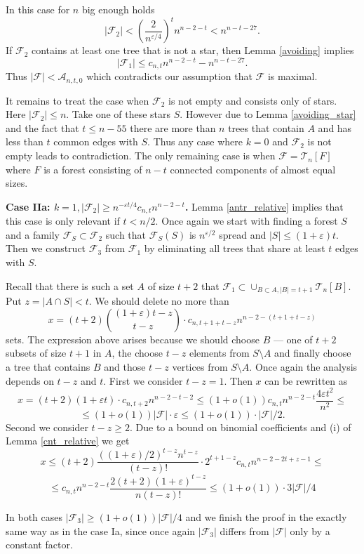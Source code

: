 \documentclass[11pt,letterpaper]{amsart}
\newcommand{\eps}{\varepsilon}
\renewcommand{\le}{\leqslant}
\renewcommand{\ge}{\geqslant}
\newcommand{\ff}{\mathcal{F}}
\newcommand{\aaa}{\mathcal{A}}
\newcommand{\T}{\mathcal{T}}
\begin{document}
In this case for $n$ big enough holds $$|\ff_2| < \left(\frac{2}{n^{\eps/4}}\right)^tn^{n-2-t} < n^{n-t-27}.$$
If $\ff_2$ contains at least one tree that is not a star, then Lemma \ref{avoiding} implies $$|\ff_1|\leqslant c_{n, t}n^{n-2-t} - n^{n-t-27}.$$ Thus $|\ff| < \aaa_{n, t, 0}$ which contradicts our assumption that $\ff$ is maximal.

It remains to treat the case when $\ff_2$ is not empty and consists only of stars. Here $|\ff_2|\le n$. Take one of these stars $S$. However due to Lemma \ref{avoiding_star} and the fact that $t \le n - 55$ there are more than $n$ trees that contain $A$ and has less than $t$ common edges with $S$. Thus any case where $k=0$ and $\ff_2$ is not empty leads to contradiction. The only remaining case is when $\ff = \T_n[F]$ where $F$ is a forest consisting of $n-t$ connected components of almost equal sizes.

\textbf{Case IIa: $k = 1, |\ff_2| \ge {n^{-\eps t/4}}c_{n, t}n^{n-2-t}$.} Lemma \ref{antr_relative} implies that this case is only relevant if $t < n/2$. Once again we start with finding a forest $S$ and a family $\ff_S \subset \ff_2$ such that $\ff_S(S)$ is $n^{\eps/2}$ spread and $|S| \leq (1+\eps)t$. Then we construct $\ff_3$ from $\ff_1$ by eliminating all trees that share at least $t$ edges with $S$.

Recall that there is such a set $A$ of size $t+2$ that $\ff_1 \subset \cup_{B\subset A, |B| = t+1}\T_n[B]$. Put $z = |A \cap S| < t$. We should delete
no more than $$x = (t+2){(1+\eps)t-z \choose t-z}\cdot c_{n, t+1+t-z}n^{n-2-(t+1+t-z)}$$ sets. The expression above arises because we should choose $B$ --- one of $t+2$ subsets of size $t+1$ in $A$, the choose $t-z$ elements from $S\setminus A$ and finally choose a tree that contains $B$ and those $t-z$ vertices from $S\setminus A$. Once again the analysis depends on $t-z$ and $t$. First we consider $t - z = 1$. Then $x$ can be rewritten as 
$$x = (t+2)(1 + \eps t)\cdot c_{n, t+2}n^{n-2-t - 2} \le (1+o(1))c_{n, t}n^{n-2-t}\frac{4\eps t^2}{n^2} \le $$$$ \le (1+o(1))|\ff| \cdot \eps \le (1+o(1))\cdot |\ff|/2.$$
Second we consider $t-z \ge 2$. Due to a bound on binomial coefficients and (i) of Lemma \ref{cnt_relative} we get $$x \le (t+2)\frac{((1+\eps)/2)^{t-z}n^{t-z}}{(t-z)!} \cdot 2^{t+1-z}c_{n, t}n^{n- 2 - 2t + z - 1} \le $$ $$\le c_{n, t}n^{n-2-t}\frac{2(t+2)(1+\eps)^{t-z}}{n(t-z)!} \le (1+o(1))\cdot 3|\ff|/4$$

In both cases $|\ff_3| \ge (1+o(1))|\ff|/4$ and we finish the proof in the exactly same way as in the case Ia, since once again $|\ff_3|$ differs from $|\ff|$ only by a constant factor.
\end{document}
